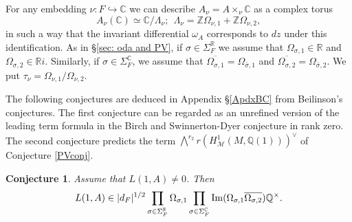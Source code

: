 \documentclass{amsart}
\newtheorem{conjecture}[theorem]{Conjecture}
\theoremstyle{definition}
\theoremstyle{remark}
\numberwithin{equation}{section}
\newcommand{\Z}{{\mathbb Z}}
\newcommand{\Q}{{\mathbb Q}}
\newcommand{\C}{{\mathbb C}}
\newcommand{\R}{{\mathbb R}}
\newcommand{\cM}{{\mathcal M}}
\begin{document}
For any embedding $\nu:F\hookrightarrow\C$ we can describe $A_{\nu}=A\times_{\nu}\C$ as a complex torus $$A_{\nu}(\C)\simeq \C/\Lambda_{\nu}; \ \  \Lambda_\nu=\Z\Omega_{{\nu},1}+\Z\Omega_{{\nu},2},$$ in such a way that the invariant differential $\omega_A$ corresponds to $dz$ under this identification. As in \S\ref{sec: oda and PV}, if $\sigma\in \Sigma_F^\R$ we assume that $\Omega_{\sigma,1}\in\R$ and $ \Omega_{\sigma,2}\in \R i$. Similarly, if  $\sigma\in \Sigma_F^\C$, we assume that $\overline{\Omega_{\sigma,1}}=\Omega_{\bar\sigma,1}$ and $\overline{\Omega_{\sigma,2}}=\Omega_{\bar\sigma,2}$. We put $\tau_\nu=\Omega_{\nu,1}/\Omega_{\nu,2}$.

The following conjectures are deduced in Appendix \S\ref{ApdxBC} from Beilinson's conjectures. The first conjecture can be regarded as an unrefined version of the leading term formula in the Birch and Swinnerton-Dyer conjecture in rank zero. The second conjecture predicts the term $ \bigwedge^{{r_2}}r\left(H^1_{\cM}(M,\Q(1))\right)^\vee$ of Conjecture \ref{PVconj}.
\begin{conjecture}\label{BSDBeilinson}
    Assume that $L(1,A)\neq0$. Then
    \begin{equation*}
    L(1,A)\in|d_F|^{1/2}\prod_{\sigma\in\Sigma_F^\R}\Omega_{\sigma, 1}\prod_{\sigma\in\Sigma_F^\C}{\rm Im}(\Omega_{\sigma, 1}\overline{\Omega_{\sigma,2}})\Q^\times.
    \end{equation*}
    \end{conjecture}
\end{document}
